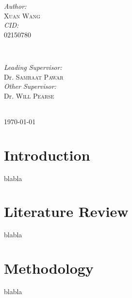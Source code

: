 \documentclass[12pt]{article}
\begin{document}
\begin{titlepage}
\begin{minipage}{0.4\textwidth}
\begin{flushleft} \large
\emph{Author:}\\
\textsc{Xuan Wang} \\ 
\emph{CID:}\\
02150780
\end{flushleft}
\end{minipage}
~
\begin{minipage}{0.5\textwidth}
\begin{flushright} \large
\emph{Leading Supervisor:} \\
Dr. \textsc{Samraat Pawar} \\[0.5cm] %
\emph{Other Supervisor:} \\
Dr. \textsc{Will Pearse} %
\end{flushright}
\end{minipage}\\[1cm]


{\large \today}\\[0.5cm] 


\vfill 

\end{titlepage}

\renewcommand{\abstractname}{Abstract}
\begin{abstract}

\end{abstract}

\newpage
\tableofcontents
\newpage

\section{Introduction}
blabla

\newpage
\section{Literature Review}
blabla

\newpage
\section{Methodology}
blabla
\end{document}
